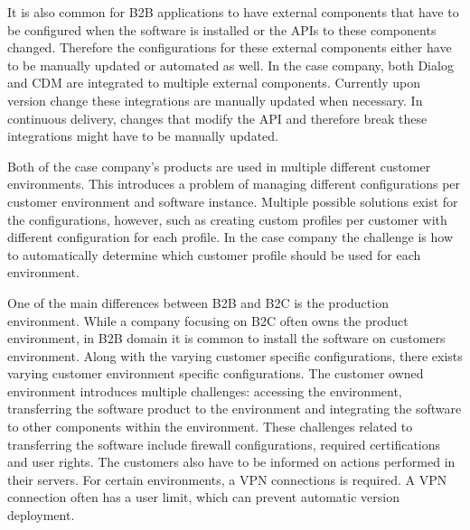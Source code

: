 \documentclass[english]{tktltiki2}
\theoremstyle{definition}
\theoremstyle{remark}
\begin{document}
It is also common for B2B applications to have external components that have to be configured when the software is installed or the APIs to these components changed. Therefore the configurations for these external components either have to be manually updated or automated as well. In the case company, both Dialog and CDM are integrated to multiple external components. Currently upon version change these integrations are manually updated when necessary. In continuous delivery, changes that modify the API and therefore break these integrations might have to be manually updated.

Both of the case company's products are used in multiple different customer environments. This introduces a problem of managing different configurations per customer environment and software instance. Multiple possible solutions exist for the configurations, however, such as creating custom profiles per customer with different configuration for each profile. In the case company the challenge is how to automatically determine which customer profile should be used for each environment.

One of the main differences between B2B and B2C is the production environment. While a company focusing on B2C often owns the product environment, in B2B domain it is common to install the software on customers environment. Along with the varying customer specific configurations, there exists varying customer environment specific configurations. The customer owned environment introduces multiple challenges: accessing the environment, transferring the software product to the environment and integrating the software to other components within the environment. These challenges related to transferring the software include firewall configurations, required certifications and user rights. The customers also have to be informed on actions performed in their servers. For certain environments, a VPN connections is required. A VPN connection often has a user limit, which can prevent automatic version deployment.




\end{document}
